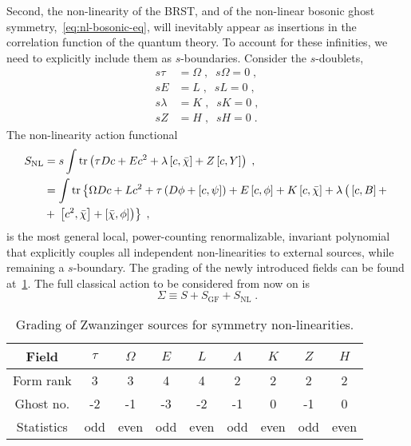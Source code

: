 \documentclass[../main.tex]{subfiles}
\begin{document}
Second, the non-linearity of the BRST, and of the non-linear bosonic ghost symmetry,~\eqref{eq:nl-bosonic-eq}, will inevitably appear as insertions in the correlation function of the quantum theory. To account for these infinities, we need to explicitly include them as $ s $-boundaries. Consider the $ s $-doublets,
\begin{subequations}%
  \label{eq:nl-s-doublets}
  \begin{align}
    s\tau    & = \Omega \;, \;\; s\Omega   = 0 \;, \\
    sE       & = L \;, \;\; sL        = 0 \;,      \\
    s\lambda & = K \;, \;\; sK        = 0 \;,      \\
    sZ       & = H \;, \;\; sH        = 0 \;.
  \end{align}
\end{subequations}
The non-linearity action functional
\begin{subequations}%
  \label{eq:nl-action}
  \begin{align}
    S_{\text{NL}} & = s \int \operatorname{tr} \left( \tau Dc + E c^2 + \lambda \left[ c,\bar\chi \right] + Z \left[ c,Y \right] \right) \;, \label{eq:nl-action-1}                                                                                           \\
                  & = \int \operatorname{tr} \left\{ \Omega Dc + Lc^2 + \tau \left( D\phi + \left[ c,\psi \right] \right) + E \left[ c,\phi \right] + K \left[ c,\bar\chi \right] + \lambda \left(\vphantom{^2}\left[ c,B \right] + \right. \right. \nonumber \\
                  & + \left. \left. \left[ c^2,\bar\chi \right] + \left[ \bar\chi,\phi \right] \right) \right\} \;,
  \end{align}
\end{subequations}
is the most general local, power-counting renormalizable, invariant polynomial that explicitly couples all independent non-linearities to external sources, while remaining a $ s $-boundary. The grading of the newly introduced fields can be found at~\ref{tab:nl-sources}. The full classical action to be considered from now on is
\begin{equation}
  \label{eq:total-action}
  \Sigma \equiv S + S_{\text{GF}} + S_{ \text{NL} }\; .
\end{equation}

\begin{table}[htpb]
  \caption{Grading of Zwanzinger sources for symmetry non-linearities.}%
  \label{tab:nl-sources}
  \begin{tabular}{ccccccccc}
    \toprule
    Field      & $\tau$ & $\Omega$ & $E$ & $L$  & $\Lambda$ & $K$  & $Z$ & $H$  \\
    \midrule
    Form rank  & 3      & 3        & 4   & 4    & 2         & 2    & 2   & 2    \\
    Ghost no.  & -2     & -1       & -3  & -2   & -1        & 0    & -1  & 0    \\
    Statistics & odd    & even     & odd & even & odd       & even & odd & even \\
    \bottomrule
  \end{tabular}
\end{table}
\end{document}
